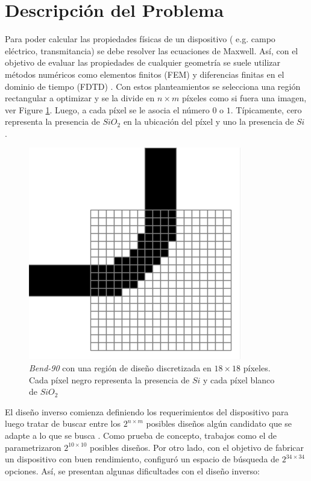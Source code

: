 \section{Descripción del  Problema}


Para poder calcular las propiedades físicas de un dispositivo ( e.g. campo eléctrico, transmitancia) se debe resolver las ecuaciones de Maxwell.
Así, con el objetivo de evaluar las propiedades de cualquier geometría  se suele utilizar métodos numéricos como elementos finitos (FEM) y diferencias finitas en el dominio de tiempo (FDTD) \citep{Schneider2019}.
Con estos planteamientos se selecciona una región rectangular a optimizar y se la divide  en $n \times m$  píxeles como si fuera una imagen, ver Figure \ref{fig:bend-discretization}. 
Luego, a cada píxel se le asocia el número $0$ o $1$.
Típicamente, cero representa la presencia de $SiO_2$ en la ubicación del píxel y uno la presencia de $Si$ \citep{Molesky2018}.

\begin{figure}[h]
  \centering
  \includegraphics[scale=0.6]{image/introduction/bend-discretization.png}
  \caption{\emph{Bend-90} con una región de diseño discretizada en $18 \times 18$ píxeles. Cada píxel negro representa la presencia de $Si$ y cada píxel blanco de $SiO_2$}
  \label{fig:bend-discretization}
\end{figure}

El diseño inverso comienza definiendo los requerimientos del dispositivo para luego tratar de buscar entre los $2^{n \times m}$ posibles diseños algún candidato que se adapte a lo que se busca \citep{Su2020, Molesky2018}.
Como prueba de concepto, trabajos como el de \cite{Malheiros-Silveira2020} parametrizaron $2^{10 \times 10}$ posibles diseños.
Por otro lado, \cite{Su2020} con el objetivo de fabricar un dispositivo con buen rendimiento, configuró un espacio de búsqueda de $2^{34 \times 34}$ opciones.
Así, se presentan algunas dificultades con el diseño inverso:

